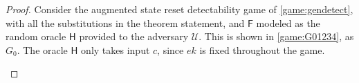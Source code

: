 \begin{proof}
Consider the augmented state reset detectability game of \autoref{game:gendetect}, with all the substitutions in the theorem statement, and $\mathsf{F}$ modeled as the random oracle $\mathsf{H}$ provided to the adversary $\mathcal{U}$. This is shown in \autoref{game:G01234}, as $G_0$. The oracle $\mathsf{H}$ only takes input $c$, since $ek$ is fixed throughout the game.

\begin{figure}
\centering
\begin{pchstack}
\begin{pcvstack}
\pcvspace
{}
\pcvspace
{}
\end{pcvstack}
\pchspace
\begin{pcvstack}
\end{pcvstack}
\end{pchstack}
\end{figure}
\end{proof}
